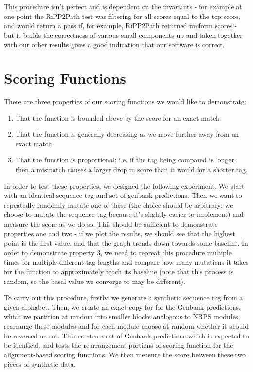 \documentclass{l4proj}
\begin{document}
This procedure isn't perfect and is dependent on the invariants - for example at one point the RiPP2Path test was filtering for all scores equal to the top score, and would return a pass if, for example, RiPP2Path returned uniform scores - but it builds the correctness of various small components up and taken together with our other results gives a good indication that our software is correct.

\section{Scoring Functions} \label{scoregraphs}

There are three properties of our scoring functions we would like to demonstrate:
\begin{enumerate}
	\item That the function is bounded above by the score for an exact match.
	\item That the function is generally decreasing as we move further away from an exact match.
	\item That the function is proportional; i.e. if the tag being compared is longer, then a mismatch causes a larger drop in score than it would for a 		shorter tag.
\end{enumerate}

In order to test these properties, we designed the following experiment. We start with an identical sequence tag and set of genbank predictions. Then we want to repeatedly randomly mutate one of these (the choice should be arbitrary; we choose to mutate the sequence tag because it's slightly easier to implement) and measure the score as we do so. This should be sufficient to demonstrate properties one and two - if we plot the results, we should see that the highest point is the first value, and that the graph trends down towards some baseline. In order to demonstrate property 3, we need to repreat this procedure multiple times for multiple different tag lengths and compare how many mutations it takes for the function to approximately reach its baseline (note that this process is random, so the basal value we converge to may be different).

To carry out this procedure, firstly, we generate a synthetic sequence tag from a given alphabet. Then, we create an exact copy for for the Genbank predictions, which we partition at random into smaller blocks analogous to NRPS modules, rearrange these modules and for each module choose at random whether it should be reversed or not. This creates a set of Genbank predictions which is expected to be identical, and tests the rearrangement portions of scoring function for the alignment-based scoring functions. We then measure the score between these two pieces of synthetic data.
\end{document}
